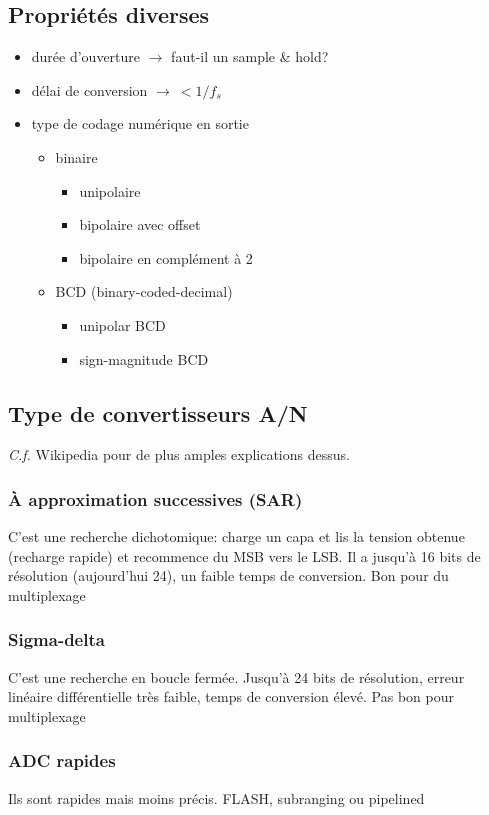 \subsection{Propriétés diverses}
\begin{itemize}
	\item durée d'ouverture \(\rightarrow\) faut-il un sample \& hold?
	\item délai de conversion \(\rightarrow\ < 1/f_s\)
	\item type de codage numérique en sortie
	\begin{itemize}
		\item binaire
		\begin{itemize}
			\item unipolaire
			\item bipolaire avec offset
			\item bipolaire en complément à 2 
		\end{itemize}
		\item BCD (binary-coded-decimal)
		\begin{itemize}
			\item unipolar BCD
			\item sign-magnitude BCD
		\end{itemize}
	\end{itemize}
\end{itemize}
\subsection{Type de convertisseurs A/N}
\textit{C.f.} Wikipedia pour de plus amples explications dessus.
\subsubsection{À approximation successives (SAR)}
C'est une recherche dichotomique: charge un capa et lis la tension obtenue (recharge rapide) et recommence du MSB vers le LSB. Il a jusqu'à 16 bits de résolution (aujourd'hui 24), un faible temps de conversion. Bon pour du multiplexage
\subsubsection{Sigma-delta}
C'est une recherche en boucle fermée. Jusqu'à 24 bits de résolution, erreur linéaire différentielle très faible, temps de conversion élevé. Pas bon pour multiplexage
\subsubsection{ADC rapides}
Ils sont rapides mais moins précis. FLASH, subranging ou pipelined\bigskip